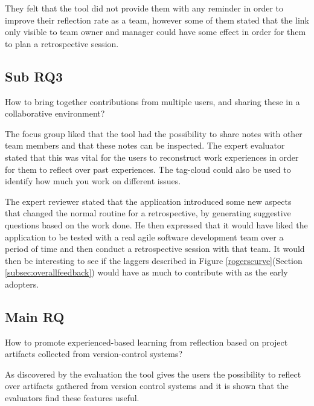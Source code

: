 They felt that the tool did not provide them with any reminder in order to improve their reflection rate as a team, however some of them stated that the link only visible to team owner and manager could have some effect in order for them to plan a retrospective session.

\subsection{Sub RQ3}
\noindent\makebox[\linewidth]{\rule{\textwidth}{0.5pt}} 

\begin{center}
How to bring together contributions from multiple users, and sharing these in a collaborative environment? \\
\end{center}

\noindent\makebox[\linewidth]{\rule{\textwidth}{0.5pt}}
The focus group liked that the tool had the possibility to share notes with other team members and that these notes can be inspected. The expert evaluator stated that this was vital for the users to reconstruct work experiences in order for them to reflect over past experiences. The tag-cloud could also be used to identify how much you work on different issues.

The expert reviewer stated that the application introduced some new aspects that changed the normal routine for a retrospective, by generating suggestive questions based on the work done. He then expressed that it would have liked the application to be tested with a real agile software development team over a period of time and then conduct a retrospective session with that team. It would then be interesting to see if the laggers described in Figure \ref{rogerscurve}(Section \ref{subsec:overallfeedback}) would have as much to contribute with as the early adopters.

\subsection{Main RQ}
\noindent\makebox[\linewidth]{\rule{\textwidth}{0.5pt}} 

\begin{center}
How to promote experienced-based learning from reflection based on project artifacts collected from version-control systems? \\
\end{center}

\noindent\makebox[\linewidth]{\rule{\textwidth}{0.5pt}} 
As discovered by the evaluation the tool gives the users the possibility to reflect over artifacts gathered from version control systems and it is shown that the evaluators find these features useful.

